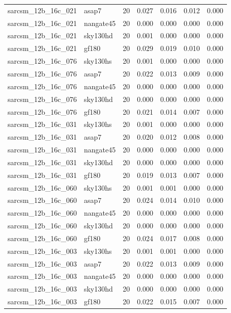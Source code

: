 \begin{tabular}{llrrrrr}
sarcsm\_12b\_16c\_021 & asap7 & 20 & 0.027 & 0.016 & 0.012 & 0.000 \\
sarcsm\_12b\_16c\_021 & nangate45 & 20 & 0.000 & 0.000 & 0.000 & 0.000 \\
sarcsm\_12b\_16c\_021 & sky130hd & 20 & 0.001 & 0.000 & 0.000 & 0.000 \\
sarcsm\_12b\_16c\_021 & gf180 & 20 & 0.029 & 0.019 & 0.010 & 0.000 \\
sarcsm\_12b\_16c\_076 & sky130hs & 20 & 0.001 & 0.000 & 0.000 & 0.000 \\
sarcsm\_12b\_16c\_076 & asap7 & 20 & 0.022 & 0.013 & 0.009 & 0.000 \\
sarcsm\_12b\_16c\_076 & nangate45 & 20 & 0.000 & 0.000 & 0.000 & 0.000 \\
sarcsm\_12b\_16c\_076 & sky130hd & 20 & 0.000 & 0.000 & 0.000 & 0.000 \\
sarcsm\_12b\_16c\_076 & gf180 & 20 & 0.021 & 0.014 & 0.007 & 0.000 \\
sarcsm\_12b\_16c\_031 & sky130hs & 20 & 0.001 & 0.000 & 0.000 & 0.000 \\
sarcsm\_12b\_16c\_031 & asap7 & 20 & 0.020 & 0.012 & 0.008 & 0.000 \\
sarcsm\_12b\_16c\_031 & nangate45 & 20 & 0.000 & 0.000 & 0.000 & 0.000 \\
sarcsm\_12b\_16c\_031 & sky130hd & 20 & 0.000 & 0.000 & 0.000 & 0.000 \\
sarcsm\_12b\_16c\_031 & gf180 & 20 & 0.019 & 0.013 & 0.007 & 0.000 \\
sarcsm\_12b\_16c\_060 & sky130hs & 20 & 0.001 & 0.001 & 0.000 & 0.000 \\
sarcsm\_12b\_16c\_060 & asap7 & 20 & 0.024 & 0.014 & 0.010 & 0.000 \\
sarcsm\_12b\_16c\_060 & nangate45 & 20 & 0.000 & 0.000 & 0.000 & 0.000 \\
sarcsm\_12b\_16c\_060 & sky130hd & 20 & 0.000 & 0.000 & 0.000 & 0.000 \\
sarcsm\_12b\_16c\_060 & gf180 & 20 & 0.024 & 0.017 & 0.008 & 0.000 \\
sarcsm\_12b\_16c\_003 & sky130hs & 20 & 0.001 & 0.001 & 0.000 & 0.000 \\
sarcsm\_12b\_16c\_003 & asap7 & 20 & 0.022 & 0.013 & 0.009 & 0.000 \\
sarcsm\_12b\_16c\_003 & nangate45 & 20 & 0.000 & 0.000 & 0.000 & 0.000 \\
sarcsm\_12b\_16c\_003 & sky130hd & 20 & 0.000 & 0.000 & 0.000 & 0.000 \\
sarcsm\_12b\_16c\_003 & gf180 & 20 & 0.022 & 0.015 & 0.007 & 0.000 \\

\end{tabular}
